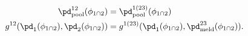 \begin{align}
  \pd_{\text{pool}}^{12}(\phi_{1 \cap 2}) 
  &= 
  \pd_{\text{pool}}^{1(23)}(\phi_{1 \cap 2}) 
  \\
  g^{12}(\pd_{1}(\phi_{1 \cap 2}), \pd_{2}(\phi_{1 \cap 2})) 
  &=
  g^{1(23)} (\pd_{1}(\phi_{1 \cap 2}), \pd_{\text{meld}}^{23}(\phi_{1 \cap 2})).
  \label{eqn:pooling-equality}
\end{align}